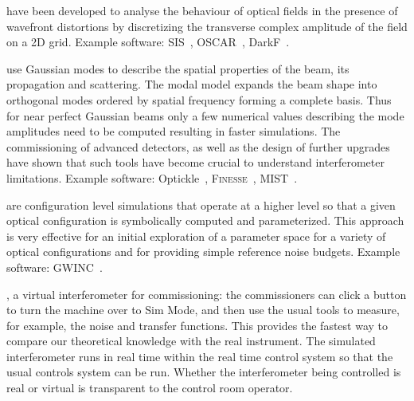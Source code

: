 \newpage

 have been developed to analyse the behaviour of optical fields in the presence of wavefront distortions by discretizing the transverse complex amplitude of the field on a 2D grid.
Example software: SIS~\cite{SIS}, OSCAR~\cite{OSCAR}, DarkF~\cite{DarkF, Vinet92}.
 
 use Gaussian modes to describe the spatial properties of the beam, its propagation and scattering. The modal model expands the beam shape into orthogonal modes ordered by spatial frequency forming a complete basis. Thus for near perfect Gaussian beams only a few numerical values describing the mode amplitudes need to be computed resulting in faster simulations. The commissioning of advanced detectors, as well as the design of further upgrades have shown that such tools have become crucial to understand interferometer limitations. 
Example software: Optickle~\cite{Optickle}, \textsc{Finesse}~\cite{Finesse, Freise04}, MIST~\cite{MIST}.

 are configuration level simulations that operate at a higher level so that a given optical configuration is symbolically computed and parameterized. 
This approach is very effective for an initial exploration of a parameter space for a variety of optical configurations and for providing simple reference noise budgets. Example software: GWINC~\cite{GWINC}.

, a virtual interferometer for commissioning: the commissioners can click a button to turn the machine over to Sim Mode, and then use the usual tools to measure, for example, the noise and transfer functions. This provides the fastest way to compare our theoretical knowledge with the real instrument.
The simulated interferometer runs in real time within the real time control system so that the usual controls system can be run. Whether the interferometer being controlled is real or virtual is transparent to the control room operator.

